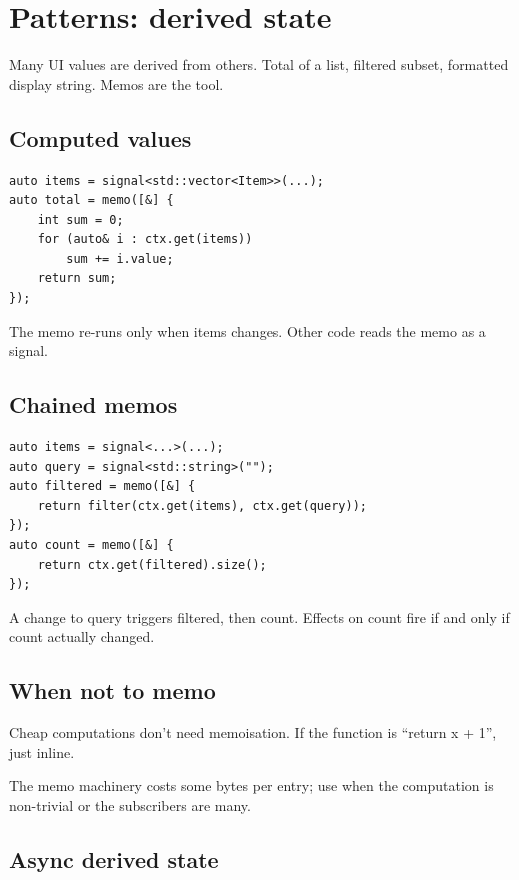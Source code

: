\chapter{Patterns: derived state}
\label{ch:derived}

\begin{aside}
Many UI values are derived from others. Total of a list,
filtered subset, formatted display string. Memos are the
tool.
\end{aside}

\section{Computed values}

\begin{lstlisting}
auto items = signal<std::vector<Item>>(...);
auto total = memo([&] {
    int sum = 0;
    for (auto& i : ctx.get(items))
        sum += i.value;
    return sum;
});
\end{lstlisting}

The memo re-runs only when items changes. Other code reads
the memo as a signal.

\section{Chained memos}

\begin{lstlisting}
auto items = signal<...>(...);
auto query = signal<std::string>("");
auto filtered = memo([&] {
    return filter(ctx.get(items), ctx.get(query));
});
auto count = memo([&] {
    return ctx.get(filtered).size();
});
\end{lstlisting}

A change to query triggers filtered, then count. Effects on
count fire if and only if count actually changed.

\section{When not to memo}

Cheap computations don't need memoisation. If the function
is ``return x + 1'', just inline.

The memo machinery costs some bytes per entry; use when
the computation is non-trivial or the subscribers are many.

\section{Async derived state}

